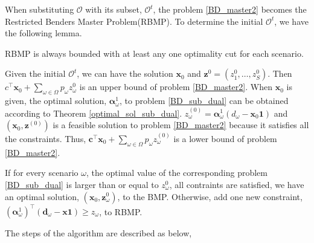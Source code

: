 When substituting $\mathcal{O}$ with its subset, $\mathcal{O}^{t}$, the problem \eqref{BD_master2} becomes the Restricted Benders Master Problem(RBMP). To determine the initial $\mathcal{O}^{t}$, we have the following lemma.

\begin{prop}\label{one_ep_feasible}
RBMP is always bounded with at least any one optimality cut for each scenario.
\end{prop}


Given the initial $\mathcal{O}^{t}$, we can have the solution $\mathbf{x}_{0}$ and $\mathbf{z}^{0} =(z^{0}_1,\ldots, z^{0}_S)$. Then $c^{\intercal} \mathbf{x}_0 + \sum_{\omega \in \Omega} p_{\omega} z_{\omega}^{0}$ is an upper bound of problem \eqref{BD_master2}. When $\mathbf{x}_0$ is given, the optimal solution, $\bm{\alpha}_{\omega}^{1}$, to problem \eqref{BD_sub_dual} can be obtained according to Theorem \ref{optimal_sol_sub_dual}. $z_{\omega}^{(0)} = \bm{\alpha}_{\omega}^{1}(d_{\omega} - \mathbf{x}_0 \mathbf{1})$ and $(\mathbf{x}_0, \mathbf{z}^{(0)})$ is a feasible solution to problem \eqref{BD_master2} because it satisfies all the constraints. Thus, $\mathbf{c}^{\intercal} \mathbf{x}_0 + \sum_{\omega \in \Omega} p_{\omega} z_{\omega}^{(0)}$ is a lower bound of problem \eqref{BD_master2}.

If for every scenario $\omega$, the optimal value of the corresponding problem \eqref{BD_sub_dual} is larger than or equal to $z_{\omega}^{0}$, all contraints are satisfied, we have an optimal solution, $(\mathbf{x}_{0}, \mathbf{z}_{\omega}^{0})$, to the BMP. Otherwise, add one new constraint, $(\bm{\alpha}_{\omega}^{1})^{\intercal}(\mathbf{d}_{\omega}- \mathbf{x} \mathbf{1}) \geq z_{\omega}$, to RBMP.




The steps of the algorithm are described as below,

